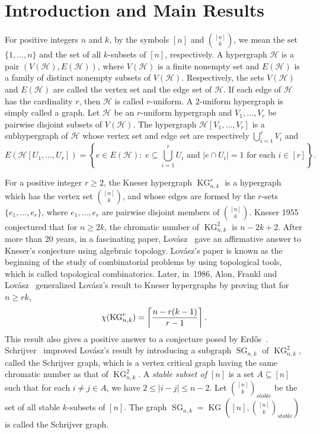 \documentclass[11pt]{amsart}
\theoremstyle{definition}
\theoremstyle{remark}
\def\ds{\displaystyle}
\def\KG{\operatorname{KG}}
\def\SG{\operatorname{SG}}
\begin{document}
\section{Introduction and Main Results}
For positive integers $n$ and $k$, by the symbols $[n]$ and ${[n]\choose k}$, we mean 
the set $\{1,\ldots,n\}$ and the set of all $k$-subsets of $[n]$, respectively.  
A hypergraph $\mathcal{H}$ is a pair $(V(\mathcal{H}),E(\mathcal{H}))$, where 
$V(\mathcal{H})$ is a finite nonempty set and $E(\mathcal{H})$ is a family of distinct
nonempty subsets of $V(\mathcal{H})$. Respectively, the sets $V(\mathcal{H})$ and $E(\mathcal{H})$ are called the vertex set and the edge set of $\mathcal{H}$.
If each  edge of $\mathcal{H}$ has the cardinality $r$, then $\mathcal{H}$ is called $r$-uniform. A $2$-uniform hypergraph is simply called a graph. 
Let $\mathcal{H}$ be  an $r$-uniform hypergraph and $V_1,\ldots,V_r$ be  pairwise disjoint subsets of $V(\mathcal{H})$. 
The hypergraph $\mathcal{H}[V_1,\ldots,V_r]$ is a subhypergraph of $\mathcal{H}$ 
whose vertex set and edge set are respectively   
$\ds\bigcup_{i=1}^rV_i$ and $$E(\mathcal{H}[U_1,\ldots, U_r])=\left\{e\in E(\mathcal{H}):\; e\subseteq \ds\bigcup_{i=1}^r U_i\mbox{ and } |e\cap U_i|= 1\mbox{ for each } i\in[r]\right\}.$$


For a positive integer $r\geq 2$,  the Kneser hypergraph $\KG^r_{n,k}$ is a 
hypergraph which has the vertex set ${[n]\choose k}$, and whose edges are   
formed by the $r$-sets $\{e_1,\ldots,e_r\}$, where $e_1,\ldots,e_r$ are pairwise disjoint members of ${[n]\choose k}$. 
Kneser 1955~\cite{MR0068536} conjectured that  for $n\geq 2k$, the chromatic number of $\KG^2_{n,k}$ is
$n-2k+2$. After more than 20 years, in a  fascinating paper, 
Lov{\'a}sz~\cite{MR514625}  gave an affirmative answer to Kneser's conjecture 
using algebraic topology. Lov{\'a}sz's paper is known as the beginning of the 
study of combinatorial problems by using topological tools, which is called topological combinatorics. Later, in~1986, Alon, Frankl and 
Lov\'asz~\cite{MR857448} generalized Lov{\'a}sz's result to Kneser hypergraphs by proving that for $n\geq rk$, 
$$\chi(\KG^r_{n,k})=\left\lceil{n-r(k-1)\over r-1}\right\rceil.$$ 
This result also gives a positive answer to a conjecture posed by Erd\H{o}s~\cite{MR0465878}. 
Schrijver~\cite{MR512648} improved Lov{\'a}sz's result 
by introducing a subgraph $\SG_{n,k}$ of $\KG^2_{n,k}$, called the Schrijver graph,  
which is a vertex critical graph having the same chromatic number as that of $\KG^2_{n,k}$.
A {\it stable subset of $[n]$} is a set $A\subseteq [n]$ such that for 
each $i\neq j\in A$, we have
$2\leq |i-j|\leq n-2$.
Let ${[n]\choose k}_{stable}$ be the set of all stable $k$-subsets of $[n]$.  
The graph $\SG_{n,k}=\KG\left([n],{[n]\choose k}_{stable}\right)$ is called the Schrijver graph.
\end{document}
